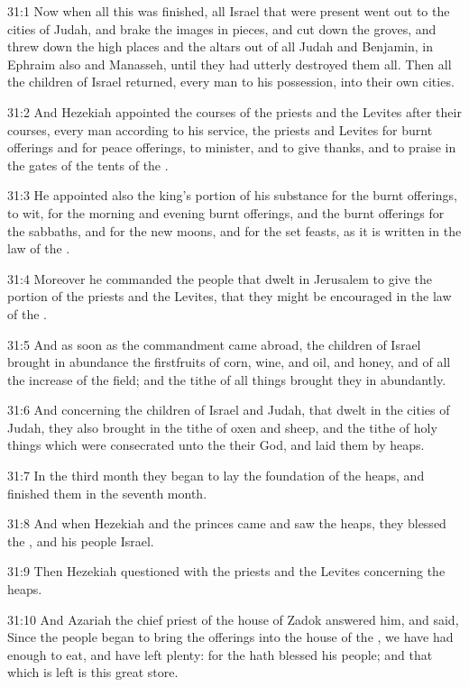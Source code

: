 31:1 Now when all this was finished, all Israel that were present went out to the cities of Judah, and brake the images in pieces, and cut down the groves, and threw down the high places and the altars out of all Judah and Benjamin, in Ephraim also and Manasseh, until they had utterly destroyed them all. Then all the children of Israel returned, every man to his possession, into their own cities.

31:2 And Hezekiah appointed the courses of the priests and the Levites after their courses, every man according to his service, the priests and Levites for burnt offerings and for peace offerings, to minister, and to give thanks, and to praise in the gates of the tents of the \LORD.

31:3 He appointed also the king's portion of his substance for the burnt offerings, to wit, for the morning and evening burnt offerings, and the burnt offerings for the sabbaths, and for the new moons, and for the set feasts, as it is written in the law of the \LORD.

31:4 Moreover he commanded the people that dwelt in Jerusalem to give the portion of the priests and the Levites, that they might be encouraged in the law of the \LORD.

31:5 And as soon as the commandment came abroad, the children of Israel brought in abundance the firstfruits of corn, wine, and oil, and honey, and of all the increase of the field; and the tithe of all things brought they in abundantly.

31:6 And concerning the children of Israel and Judah, that dwelt in the cities of Judah, they also brought in the tithe of oxen and sheep, and the tithe of holy things which were consecrated unto the \LORD their God, and laid them by heaps.

31:7 In the third month they began to lay the foundation of the heaps, and finished them in the seventh month.

31:8 And when Hezekiah and the princes came and saw the heaps, they blessed the \LORD, and his people Israel.

31:9 Then Hezekiah questioned with the priests and the Levites concerning the heaps.

31:10 And Azariah the chief priest of the house of Zadok answered him, and said, Since the people began to bring the offerings into the house of the \LORD, we have had enough to eat, and have left plenty: for the \LORD hath blessed his people; and that which is left is this great store.

